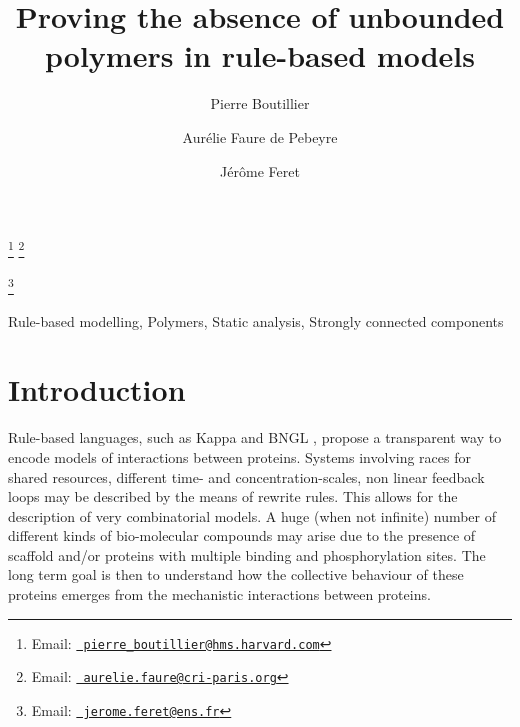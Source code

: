 \documentclass{entcs}
\begin{document}
\begin{frontmatter}
  \title{Proving the absence of unbounded polymers in rule-based models} \author{Pierre Boutillier}
  \address{Harvard Medical School, \\ Department of Systems Biology, Boston, MA 02115, USA}
  \author{Aur\'elie Faure de Pebeyre}
\address{Centre de recherche interdisciplinaire, 75004 Paris, France}
\address{INRIA, \\ Centre de recherche INRIA de Paris, 75 012 Paris, France}
\address{D\'{e}partement d'informatique de l'\'{E}cole normale sup\'{e}rieure,\\
\'Ecole normale sup\'erieure, CNRS, PSL Research University,
75 005 Paris, France}
  \author{J\'{e}r\^{o}me Feret}
  \address{INRIA, \\ Centre de recherche INRIA de Paris, 75 012 Paris, France}
  \address{D\'{e}partement d'informatique de l'\'{E}cole normale sup\'{e}rieure,\\
  \'Ecole normale sup\'erieure, CNRS, PSL Research University,
  75 005 Paris, France}
\thanks[pbemail]{Email:
    \href{mailto:pierre\_boutillier@hms.harvard.com} {\texttt{\normalshape
        pierre\_boutillier@hms.harvard.com}}}
\thanks[afemail]{Email:
            \href{mailto:aurelie.faure@cri-paris.org} {\texttt{\normalshape
        aurelie.faure@cri-paris.org}}}

\thanks[jfemail]{Email:
    \href{mailto:jerome.feret@ens.fr} {\texttt{\normalshape
        jerome.feret@ens.fr}}}
\begin{abstract}

\end{abstract}
\begin{keyword}
  Rule-based modelling,
Polymers,
Static analysis,
Strongly connected components
\end{keyword}
\end{frontmatter}

\section{Introduction}

Rule-based languages, such as Kappa \cite{DBLP:journals/tcs/DanosL04} and BNGL \cite{BNGL}, propose a transparent way to encode models of interactions between proteins.  Systems involving races for shared resources, different time- and concentration-scales, non linear feedback loops may be described by the means of rewrite rules. This allows for the description of very combinatorial models. A huge (when not infinite) number of different kinds of bio-molecular compounds may arise due to the presence of scaffold and/or proteins with multiple binding and phosphorylation sites. The long term goal is then to understand how the collective behaviour of these proteins emerges from the mechanistic interactions between proteins.
\end{document}
